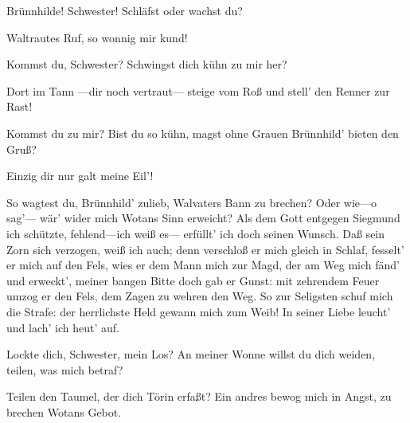 \begin{drama}

Brünnhilde! Schwester!
Schläfst oder wachst du?
 

\Brunnhildespeaks



Waltrautes Ruf, so wonnig mir kund!


Kommst du, Schwester?
Schwingst dich kühn zu mir her?


Dort im Tann
---dir noch vertraut---
steige vom Roß
und stell' den Renner zur Rast!




Kommst du zu mir?
Bist du so kühn,
magst ohne Grauen
Brünnhild' bieten den Gruß?
 

\Waltrautespeaks

Einzig dir nur galt meine Eil'!
 

\Brunnhildespeaks



So wagtest du, Brünnhild' zulieb,
Walvaters Bann zu brechen?
Oder wie---o sag'---
wär' wider mich Wotans Sinn erweicht?
Als dem Gott entgegen Siegmund ich schützte,
fehlend---ich weiß es---
erfüllt' ich doch seinen Wunsch.
Daß sein Zorn sich verzogen,
weiß ich auch;
denn verschloß er mich gleich in Schlaf,
fesselt' er mich auf den Fels,
wies er dem Mann mich zur Magd,
der am Weg mich fänd' und erweckt',
meiner bangen Bitte doch gab er Gunst:
mit zehrendem Feuer umzog er den Fels,
dem Zagen zu wehren den Weg.
So zur Seligsten schuf mich die Strafe:
der herrlichste Held
gewann mich zum Weib!
In seiner Liebe leucht' und lach' ich heut' auf.
 



Lockte dich, Schwester, mein Los?
An meiner Wonne willst du dich weiden,
teilen, was mich betraf?
 

\Waltrautespeaks



Teilen den Taumel, der dich Törin erfaßt?
Ein andres bewog mich in Angst,
zu brechen Wotans Gebot.
 



\end{drama}
